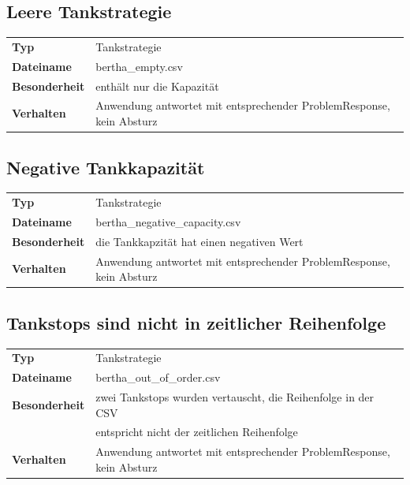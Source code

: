 \documentclass[
ngerman          %
,a4paper          %
,11pt
,pdftex
]{report}
\begin{document}
\subsection{Leere Tankstrategie}

\begin{table}[H]
	\centering
	\begin{tabular}{l l}
    	\hline
		\textbf{Typ} & Tankstrategie \\ 
		\textbf{Dateiname} & bertha\_empty.csv \\
        \textbf{Besonderheit} & enthält nur die Kapazität \\
        \textbf{Verhalten} & Anwendung antwortet mit entsprechender ProblemResponse, kein Absturz \\
		\hline 
	\end{tabular}
\end{table} 

\subsection{Negative Tankkapazität}

\begin{table}[H]
	\centering
	\begin{tabular}{l l}
    	\hline
		\textbf{Typ} & Tankstrategie \\ 
		\textbf{Dateiname} & bertha\_negative\_capacity.csv \\
        \textbf{Besonderheit} & die Tankkapzität hat einen negativen Wert \\
        \textbf{Verhalten} & Anwendung antwortet mit entsprechender ProblemResponse, kein Absturz \\
		\hline 
	\end{tabular}
\end{table} 

\subsection{Tankstops sind nicht in zeitlicher Reihenfolge}

\begin{table}[H]
	\centering
	\begin{tabular}{l l}
    	\hline
		\textbf{Typ} & Tankstrategie \\ 
		\textbf{Dateiname} & bertha\_out\_of\_order.csv \\
        \textbf{Besonderheit} & zwei Tankstops wurden vertauscht, die Reihenfolge in der CSV \\
        & entspricht nicht der zeitlichen Reihenfolge \\
        \textbf{Verhalten} & Anwendung antwortet mit entsprechender ProblemResponse, kein Absturz \\
		\hline 
	\end{tabular}
\end{table} 
\end{document}
